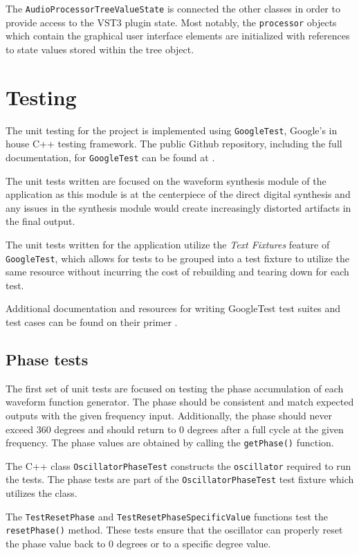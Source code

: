 \documentclass[a4paper,12pt]{report}
\begin{document}
The \texttt{Audio\-Processor\-Tree\-Value\-State} is connected the other classes in order to provide access to the VST3 plugin state. Most notably, the \texttt{processor} objects which contain the graphical user interface elements are initialized with references to state values stored within the tree object.

\section{Testing}
\label{sec:testing}
The unit testing for the project is implemented using \texttt{Google\-Test}, Google's in house C++ testing framework. The public Github repository, including the full documentation, for \texttt{Google\-Test} can be found at \cite{googletest}.

The unit tests written are focused on the waveform synthesis module of the application as this module is at the centerpiece of the direct digital synthesis and any issues in the synthesis module would create increasingly distorted artifacts in the final output.

The unit tests written for the application utilize the \emph{Text Fixtures} feature of \texttt{Google\-Test}, which allows for tests to be grouped into a test fixture to utilize the same resource without incurring the cost of rebuilding and tearing down for each test. 

Additional documentation and resources for writing GoogleTest test suites and test cases can be found on their primer \cite{googletestprimer}.

\subsection{Phase tests}
\label{subsec:phasetests}
The first set of unit tests are focused on testing the phase accumulation of each waveform function generator. The phase should be consistent and match expected outputs with the given frequency input. Additionally, the phase should never exceed 360 degrees and should return to 0 degrees after a full cycle at the given frequency. The phase values are obtained by calling the \texttt{getPhase()} function.

The C++ class \texttt{Oscillator\-Phase\-Test} constructs the \texttt{oscillator} required to run the tests. The phase tests are part of the \texttt{Oscillator\-Phase\-Test} test fixture which utilizes the class.

The \texttt{Test\-Reset\-Phase} and \texttt{Test\-Reset\-Phase\-Specific\-Value} functions test the \texttt{reset\-Phase()} method. These tests ensure that the oscillator can properly reset the phase value back to 0 degrees or to a specific degree value.
\end{document}
